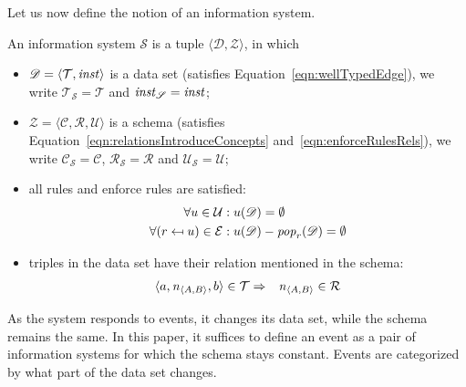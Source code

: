 \documentclass[runningheads]{llncs}
\newcommand{\id}[1]{\text{\it #1\/}}
\newcommand{\popF}[1]{\id{pop}_{#1}}
\newcommand{\pop}[2]{\popF{#1}(#2)}
\newcommand{\instance}{\mathbin{\id{inst}}}
\newcommand{\viol}[2]{{#1}(#2)}
\newcommand{\declare}[3]{\id{#1}_{\pair{#2}{#3}}}
\newcommand{\pair}[2]{\langle{#1},{#2}\rangle}
\newcommand{\triple}[3]{\langle{#1},{#2},{#3}\rangle}
\newcommand{\concepts}{\mathcal{C}}
\newcommand{\rels}{\mathcal{R}}   %
\newcommand{\triples}{\mathcal{T}}
\newcommand{\enforces}{\mathcal{E}}
\newcommand{\rules}{\mathcal{U}}
\newcommand{\dataset}{\mathscr{D}}
\newcommand{\schema}{\mathscr{Z}}
\newcommand{\infsys}{\mathscr{S}}
\def\define#1{\label{dfn:#1}{\em #1}\index{#1}}
\begin{document}
   Let us now define the notion of an information system.
\begin{definition}
\label{def:information system}
\item An information system $\infsys$ is a tuple $\pair{\dataset}{\schema}$, in which
\begin{itemize}
   \item $\dataset=\pair{\triples}{\instance}$ is a data set (satisfies Equation~\ref{eqn:wellTypedEdge}), we write $\triples_\infsys = \triples$ and $\instance_\infsys = \instance$;
   \item $\schema=\triple{\concepts}{\rels}{\rules}$ is a schema (satisfies Equation~\ref{eqn:relationsIntroduceConcepts} and~\ref{eqn:enforceRulesRels}), we write $\concepts_\infsys = \concepts$, $\rels_\infsys = \rels$ and $\rules_\infsys=\rules$;
   \item all rules and enforce rules are satisfied:
   \begin{align}
   \forall u\in\rules&:\viol{u}{\dataset}=\emptyset\\
   \forall (r\mapsfrom u)\in\enforces&:\viol{u}{\dataset} - \pop{r}{\dataset}=\emptyset
   \label{eqn:satisfaction}
   \end{align}
   \item triples in the data set have their relation mentioned in the schema:
   \begin{eqnarray}
   \triple{a}{\declare{n}{A}{B}}{b}\in\triples&\Rightarrow&\declare{n}{A}{B}\in\rels
   \label{eqn:define R}
   \end{eqnarray}
\end{itemize}
\end{definition}

   As the system responds to events, it changes its data set, while the schema remains the same.
   In this paper, it suffices to define an event as a pair of information systems for which the schema stays constant.
   Events are categorized by what part of the data set changes.
   
\end{document}
